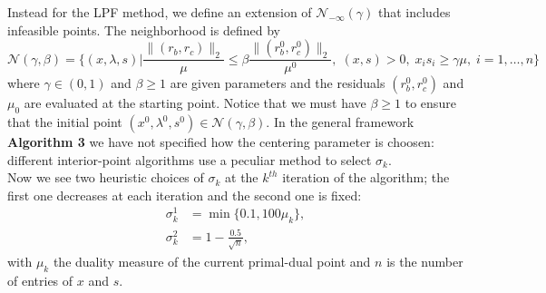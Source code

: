 \documentclass[a4paper,10 pt,titlepage,twoside]{book}
\theoremstyle{plain}
\theoremstyle{definition}
\theoremstyle{remark}
\begin{document}
Instead for the LPF method, we define an extension of $\mathcal{N}_{-\infty}(\gamma)$ that includes infeasible points. The neighborhood is defined by
 \begin{equation}\label{neigh3}
\mathcal{N}(\gamma,\beta) =\Bigg\{(x, \lambda, s) | \frac{\lVert(r_{b}, r_{c})\rVert_{2}}{\mu} \leq \beta\frac{\lVert(r_{b}^{0}, r_{c}^{0})\rVert_{2}}{\mu^{0}},\; (x, s)>0,\; x_{i}s_{i} \geq \gamma\mu,\;i = 1,\dots, n \Bigg\}
\end{equation}
where $\gamma\in(0,1)$ and $\beta \geq 1$ are given parameters and the residuals $(r_{b}^{0}, r_{c}^{0})$ and $\mu_{0}$ are evaluated at the starting point. Notice that we must have $\beta \geq 1$ to ensure that the initial point $(x^{0}, \lambda^{0}, s^{0})\in\mathcal{N}(\gamma,\beta)$.
In the general framework \textbf{Algorithm 3} we have not specified how the centering parameter is choosen: different interior-point algorithms use a peculiar method to select $\sigma_{k}$.\\
Now we see two heuristic choices of $\sigma_{k}$ at the $k^{th}$ iteration of the algorithm; the first one decreases at each iteration and the second one is fixed: 
\begin{align}
\sigma^{1}_{k} &= \min\{0.1, 100\mu_{k} \},\label{LPF1}\tag{4.13a}\\
\sigma^{2}_{k} &= 1 -\frac{0.5}{\sqrt{n}},\tag{4.13b}\label{LPF2}
\end{align}
with $\mu_{k}$ the duality measure of the current primal-dual point and $n$ is the number of entries of $x$ and $s$. 
\end{document}
